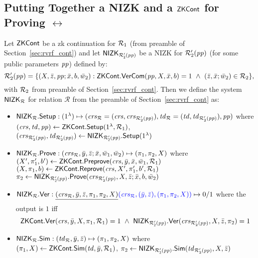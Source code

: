 \subsection{Putting Together a NIZK and a $\ZKCont$  for Proving $\rel$}
Let $\ZKCont$ be a zk continuation for $\relone$ (from preamble of Section~\ref{sec:rvrf_cont}) and 
let $\nizktwo$ be a NIZK for $\reltwo'(\pp)$ (for some public parameters $\pp$) defined by:
$$\reltwo'(\pp) = \{(X, \barz, \pp; \barx, b, \baromega_2): \ZKCont.\VerifyCom(\pp, X, \barx, b) =1 \ \wedge \ (\barz, \barx; \baromega_2) \in \reltwo \},$$
\noindent with $\reltwo$ from preamble of Section~\ref{sec:rvrf_cont}. Then we define the system $\nizkR$ for relation $\mathcal{R}$ 
from the preamble of Section~\ref{sec:rvrf_cont} as:
\begin{itemize}
\item $\nizkR.\Setup: (1^{\lambda}) \mapsto (\crsR = (\crs,\crstwo), \twR = (\tw, \twtwo), \pp)$ where
$(\crs, \tw, \pp) \leftarrow \ZKCont.\Setup(1^{\lambda}, \relone)$, \\ $(\crstwo, \twtwo) \leftarrow \nizktwo.\Setup(1^{\lambda})$


\item $\nizkR.\Prove: (\crsR,\bary, \barz; \barx, \baromega_1, \baromega_2 ) \mapsto (\pi_1, \pi_2, X)$ where \\
$(X', \pi'_1, b')\leftarrow \ZKCont.\Preprove(\crs, \bar{y}, \bar{x}, \baromega_1, \relone)$ \\
$(X, \pi_1, b) \leftarrow \ZKCont.\Reprove(\crs, X', \pi_1', b', \relone)$ \\
$ \pi_2 \leftarrow \nizktwo.\Prove(\crstwo, X, \barz; \barx, b, \baromega_2)$ 

\item $\nizkR.\Verify: \handan{(\crsR,\bary, \barz, \pi_1, \pi_2, X)}{(\crsR,(\bary, \barz), (\pi_1, \pi_2, X))} \mapsto 0/1$ where the output is $1$ iff 
$$\ZKCont.\Verify(\crs, \bar{y}, X, \pi_1, \relone) = 1 \  \wedge \ \nizktwo.\Verify(\crstwo, X, \barz, \pi_2) =1$$

\item $\nizkR.\Sim: (\twR, \bary, \barz) \mapsto (\pi_1, \pi_2, X)$ where \\
$(\pi_1, X) \leftarrow \ZKCont.\Sim(\tw, \bary, \relone)$, $\pi_2 \leftarrow \nizktwo.\Sim(\twtwo, X, \barz)$ 
 \end{itemize}
 
